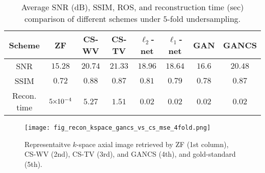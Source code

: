 \documentclass{journal}
\begin{document}



\begin{table}[t]
	\caption{Average SNR (dB), SSIM, ROS, and reconstruction time (sec) comparison of different schemes under $5$-fold undersampling.  }
	\vspace{-2.5mm}
	\label{tab:table_comp_quantitative}
	\begin{center}
		\begin{tabular} {|c|c|c|c|c|c|c|c|}
			\hline
			Scheme &  ZF & CS-WV & CS-TV &  $\ell_2$-net & $\ell_1$-net & GAN  & GANCS  \\
			\hline\hline
			SNR & $15.28$ & $20.74$ & $21.33$ & $18.96$ & $18.64$ & $16.6$ & $20.48$     \\
			\hline
			SSIM & $0.72$ & $0.88$ & $0.87$ & $0.81$  & $0.79$ & $0.78$ & $0.87$    \\
			\hline
			Recon. time & $5\hspace{-1mm} \times \hspace{-1mm} 10^{-4}$ & $5.27$ & $1.51$  & $0.02$ & $0.02$ & $0.02$ & $0.02$  \\
			\hline
			
		\end{tabular}
	\end{center}
\end{table}





\begin{figure}[t]
	\centering
	\hspace{0.0cm}\texttt{[image: fig\_recon\_kspace\_gancs\_vs\_cs\_mse\_4fold.png]}
	\caption{Representaitve $k$-space axial image retrieved by ZF (1st column), CS-WV (2nd), CS-TV (3rd), and GANCS (4th), and gold-standard (5th). }
	\label{fig:fig_recon_kspace_gancs_vs_cs_mse_4fold}
\end{figure}
\end{document}
